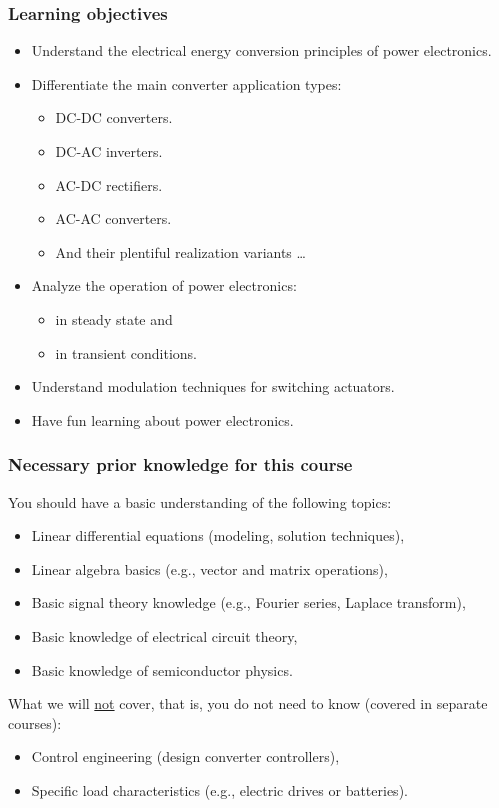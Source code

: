 \begin{frame}
	\frametitle{Learning objectives}
	\begin{itemize}
		\item Understand the electrical energy conversion principles of power electronics.
		\item<2-> Differentiate the main converter application types:
		\begin{itemize}
			\item DC-DC converters.
			\item DC-AC inverters.
			\item AC-DC rectifiers.
			\item AC-AC converters.
			\item And their plentiful realization variants \ldots
		\end{itemize}
		\item<3-> Analyze the operation of power electronics:
		\begin{itemize}
			\item in steady state and
			\item in transient conditions.
		\end{itemize} 
		\item<4-> Understand modulation techniques for switching actuators.
		\item<5-> Have fun learning about power electronics.
	\end{itemize}
\end{frame}

\begin{frame}
	\frametitle{Necessary prior knowledge for this course}
	You should have a basic understanding of the following topics:
	\begin{itemize}
		\item Linear differential equations (modeling, solution techniques),
		\item Linear algebra basics (e.g., vector and matrix operations),
		\item Basic signal theory knowledge (e.g., Fourier series, Laplace transform),
		\item Basic knowledge of electrical circuit theory,
		\item Basic knowledge of semiconductor physics.
	\end{itemize}
	\vspace{0.5cm}
	What we will \underline{not} cover, that is, you do not need to know (covered in separate courses):
	\begin{itemize}
		\item Control engineering (design converter controllers),
		\item Specific load characteristics (e.g., electric drives or batteries).
	\end{itemize}
\end{frame}

